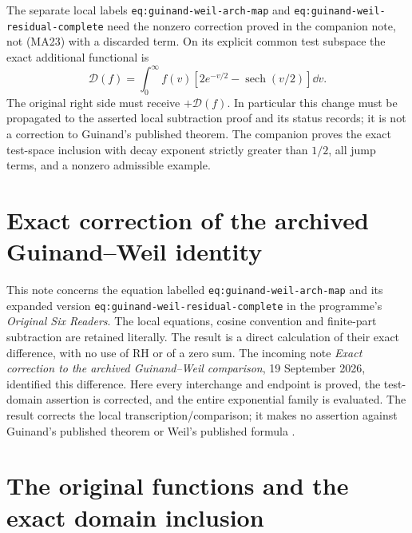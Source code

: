 The separate local labels \texttt{eq:guinand-weil-arch-map} and
\nolinkurl{eq:guinand-weil-residual-complete} need the nonzero correction proved
in the companion note, not (MA23) with a discarded term. On its explicit
common test subspace the exact additional functional is
\[
 \mathcal D(f)=\int_0^\infty f(v)
       [2e^{-v/2}-\operatorname{sech}(v/2)]\dd v.
\]
The original right side must receive $+\mathcal D(f)$. In particular this
change must be propagated to the asserted local subtraction proof and its
status records; it is not a correction to Guinand's published theorem.
The companion proves the exact test-space inclusion with decay exponent
strictly greater than $1/2$, all jump terms, and a nonzero admissible example.



\endgroup

\clearpage
\begingroup
\def\R{\mathbb R}
\def\C{\mathbb C}
\def\PF{\operatorname{PF}}
\def\sech{\operatorname{sech}}

\setcounter{equation}{0}
\renewcommand{\theequation}{A03GC.\arabic{equation}}
\section*{Exact correction of the archived Guinand--Weil identity}



This note concerns the equation labelled
\texttt{eq:guinand-weil-arch-map} and its expanded version
\texttt{eq:guinand-weil-residual-complete} in the programme's
\emph{Original Six Readers}.  The local equations, cosine convention and
finite-part subtraction are retained literally.  The result is a direct
calculation of their exact difference, with no use of RH or of a zero sum.
The incoming note \emph{Exact correction to the archived Guinand--Weil
comparison}, 19 September 2026, identified this difference.  Here every
interchange and endpoint is proved, the test-domain assertion is corrected,
and the entire exponential family is evaluated.  The result corrects the
local transcription/comparison; it makes no assertion against Guinand's
published theorem \cite{a03gc:guinand1948} or Weil's published formula
\cite{a03gc:weil1952}.

\section{The original functions and the exact domain inclusion}

